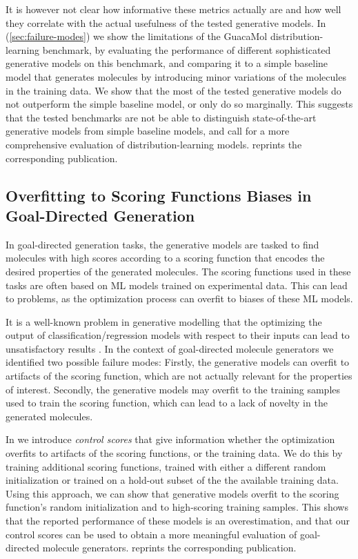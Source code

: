 It is however not clear how informative these metrics actually are and how well
they correlate with the actual usefulness of the tested generative models. In
\citep{renzFailureModesMolecule2019} (\cref{sec:failure-modes}) we show the
limitations of the GuacaMol distribution-learning benchmark, by evaluating the
performance of different sophisticated generative models on this benchmark, and
comparing it to a simple baseline model that generates molecules by introducing
minor variations of the molecules in the training data. We show that the 
most of the tested generative models do not outperform the simple baseline
model, or only do so marginally. This suggests that the tested benchmarks
are not be able to distinguish state-of-the-art generative models 
from simple baseline models, and call for a more comprehensive evaluation of
distribution-learning models.  reprints
the corresponding publication.

\subsection{Overfitting to Scoring Functions Biases in Goal-Directed Generation}
In goal-directed generation tasks, the generative models are tasked to find
molecules with high scores according to a scoring function that encodes the
desired properties of the generated molecules. The scoring functions used in
these tasks are often based on ML models trained on experimental
data. This can lead to problems, as the optimization process can overfit to
biases of these ML models. 

It is a well-known problem in generative modelling that the optimizing the
output of classification/regression models with respect to their inputs can lead
to unsatisfactory results \citep{todo}. In the context of goal-directed molecule
generators we identified two possible failure modes: Firstly, the generative
models can overfit to artifacts of the scoring function, which are not actually
relevant for the properties of interest. Secondly, the generative models may
overfit to the training samples used to train the scoring function, which can
lead to a lack of novelty in the generated molecules.

In \citep{renzFailureModesMolecule2019} we introduce \emph{control scores} that
give information whether the optimization overfits to artifacts of the scoring
functions, or the training data. We do this by training additional scoring
functions, trained with either a different random initialization or trained on a
hold-out subset of the the available training data. Using this approach, we can
show that generative models overfit to the scoring function's random
initialization and to high-scoring training samples. This shows that the reported
performance of these models is an overestimation, and that our control 
scores can be used to obtain a more meaningful evaluation of goal-directed 
molecule generators.  reprints
the corresponding publication.

